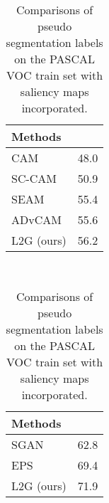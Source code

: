 \documentclass[10pt,twocolumn,letterpaper]{article}
\begin{document}
\begin{table}[t]
  \small
  ~~~\begin{minipage}[c]{0.2\textwidth}
  \centering
  \caption{Comparison of pseudo segmentation labels 
  on the PASCAL VOC train set with no saliency maps. }
  \label{tab:seed_comps}
  \vspace{-5pt}
  \renewcommand{\arraystretch}{1.1}\setlength\tabcolsep{1.5mm}
  \begin{tabular}{l|c} \toprule[1.0pt]
     Methods     &     \\ 
     \midrule[0.8pt]
     CAM \cite{zhou2016learning}     &  48.0  \\  
     SC-CAM \cite{chang2020weakly}   &  50.9  \\  
     SEAM \cite{wang2020self}        &  55.4  \\
     ADvCAM \cite{lee2021anti}       &  55.6  \\
     \rowcolor{gray!32} L2G (ours)   &  56.2  \\
  \bottomrule[1.0pt]
  \end{tabular}    
  \vspace{-10pt} 
  \end{minipage}  ~~~~~~~~~
  \begin{minipage}[c]{0.2\textwidth}
  \centering
  \caption{Comparisons of pseudo segmentation labels 
  on the PASCAL VOC train set with saliency maps incorporated.
}
\renewcommand{\arraystretch}{1.3}\setlength\tabcolsep{1.5mm}
  \begin{tabular}{l|c} \toprule[1.0pt]
   Methods     &     \\ 
   \midrule[0.8pt]
   SGAN \cite{yao2020saliency}    &  62.8  \\
   EPS \cite{lee2021railroad}     &  69.4  \\
   \rowcolor{gray!32} L2G (ours)  &  71.9  \\
  \bottomrule[1pt]
  \end{tabular}   
  \vspace{-10pt} 
\label{tab:seed_comps_sal}
\end{minipage} 
\end{table}
\end{document}
